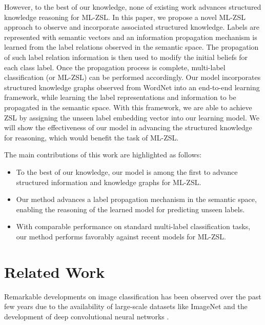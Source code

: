 \documentclass[10pt,twocolumn,letterpaper]{article}
\begin{document}
However, to the best of our knowledge, none of existing work advances structured knowledge reasoning for ML-ZSL. In this paper, we propose a novel ML-ZSL approach to observe and incorporate associated structured knowledge. Labels are represented with semantic vectors and an information propagation mechanism is learned from the label relations observed in the semantic space. The propagation of such label relation information is then used to modify the initial beliefs for each class label. Once the propagation process is complete, multi-label classification (or ML-ZSL) can be performed accordingly. Our model incorporates structured knowledge graphs observed from WordNet \cite{Miller:1995:WLD:219717.219748} into an end-to-end learning framework, while learning the label representations and information to be propagated in the semantic space. With this framework, we are able to achieve ZSL by assigning the unseen label embedding vector into our learning model. We will show the effectiveness of our model in advancing the structured knowledge for reasoning, which would benefit the task of ML-ZSL. 

The main contributions of this work are highlighted as follows:

\begin{itemize}
\item To the best of our knowledge, our model is among the first to advance structured information and knowledge graphs for ML-ZSL.
\item Our method advances a label propagation mechanism in the semantic space, enabling the reasoning of the learned model for predicting unseen labels.
\item With comparable performance on standard multi-label classification tasks, our method performs favorably against recent models for ML-ZSL.
\end{itemize}%
\section{Related Work}
Remarkable developments on image classification has been observed over the past few years due to the availability of large-scale datasets like ImageNet \cite{deng2009imagenet} and the development of deep convolutional neural networks \cite{krizhevsky2012imagenet,He_2016_CVPR}. 
\end{document}
